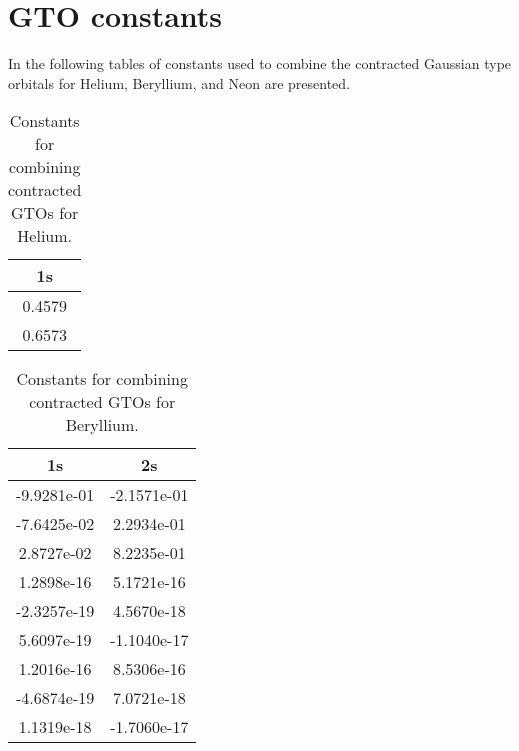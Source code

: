\chapter{GTO constants}
\label{sec:GTO_app}
	In the following tables of constants used to combine the contracted Gaussian type orbitals for Helium, Beryllium, and Neon are presented.

	\begin{table}[H]
		\begin{centering}
			\begin{tabular}{|c|}
				\hline 
				1s\tabularnewline
				\hline 
				0.4579\tabularnewline
				\hline 
				0.6573\tabularnewline
				\hline 
			\end{tabular}
		\par\end{centering}
		\caption{Constants for combining contracted GTOs for Helium. \label{tab:GTO_constants_He}}
	\end{table}

	\begin{table}[H]
		\begin{centering}
			\begin{tabular}{|c|c|}
			\hline 
			1s  & 2s\tabularnewline
			\hline 
			-9.9281e-01  & -2.1571e-01\tabularnewline
			\hline 
			-7.6425e-02  & 2.2934e-01\tabularnewline
			\hline 
			2.8727e-02  & 8.2235e-01\tabularnewline
			\hline 
			1.2898e-16  & 5.1721e-16\tabularnewline
			\hline 
			-2.3257e-19  & 4.5670e-18\tabularnewline
			\hline 
			5.6097e-19  & -1.1040e-17\tabularnewline
			\hline 
			1.2016e-16  & 8.5306e-16\tabularnewline
			\hline 
			-4.6874e-19  & 7.0721e-18\tabularnewline
			\hline 
			1.1319e-18  & -1.7060e-17\tabularnewline
			\hline 
		\end{tabular}
		\par\end{centering}
		\caption{Constants for combining contracted GTOs for Beryllium. \label{tab:GTO_constants_Be}}
	\end{table}

